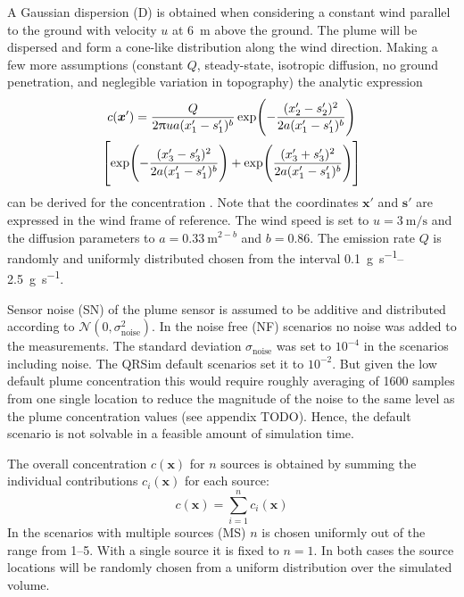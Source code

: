 \documentclass[11pt,a4paper]{scrreprt}
\newcommand{\vc}[1]{\bm{#1}}
\newcommand{\ped}[1]{_{\mathrm{#1}}}
\begin{document}
A Gaussian dispersion (D) is obtained when considering a constant wind parallel 
to the ground with velocity $u$ at \SI{6}{\meter} above the ground. The plume 
will be dispersed and form a cone-like distribution along the wind direction.  
Making a few more assumptions (constant $Q$, steady-state, isotropic diffusion, 
no ground penetration, and neglegible variation in topography) the analytic 
expression
\begin{multline}
    c(\vc x') = \frac{Q}{2\uppi ua(x'_1 - s'_1)^b} \exp\!\del{-\frac{(x'_2 
            - s'_2)^2}{2a(x'_1 - s'_1)^b}} \\ \sbr{\exp\!\del{-\frac{(x'_3 
                - s'_3)^2}{2a(x'_1 - s'_1)^b}} + \exp\!\del{\frac{(x'_3 
                + s'_3)^2}{2a(x'_1 - s'_1)^b}}}
\end{multline}
can be derived for the concentration \parencite{Stockie:2011fd}. Note that the 
coordinates $\vc x'$ and $\vc s'$ are expressed in the wind frame of reference. 
The wind speed is set to $u = \SI{3}{\meter\per\second}$ and the diffusion 
parameters to $a = \SI{0.33}{\meter\tothe{2 - \mathit{b}}}$ and $b = 0.86$.  The 
emission rate $Q$ is randomly and uniformly distributed chosen from the interval 
\SIrange{0.1}{2.5}{\gram\per\second}.

Sensor noise (SN) of the plume sensor is assumed to be additive and distributed 
according to $\mathcal{N}(0, \sigma\ped{noise}^2)$. In the noise free (NF) 
scenarios no noise was added to the measurements. The standard deviation 
$\sigma\ped{noise}$ was set to $10^{-4}$ in the scenarios including noise. The 
QRSim default scenarios set it to $10^{-2}$. But given the low default plume 
concentration this would require roughly averaging of 1600 samples from one 
single location to reduce the magnitude of the noise to the same level as the 
plume concentration values (see appendix TODO). Hence, the default scenario is 
not solvable in a feasible amount of simulation time.

The overall concentration $c(\vc x)$ for $n$ sources is obtained by summing the 
individual contributions $c_i(\vc x)$ for each source:
\begin{equation}
    c(\vc x) = \sum_{i = 1}^n c_i(\vc x)
\end{equation}
In the scenarios with multiple sources (MS) $n$ is chosen uniformly out of the 
range from \numrange{1}{5}. With a single source it is fixed to $n = 1$. In both 
cases the source locations will be randomly chosen from a uniform distribution 
over the simulated volume.
\end{document}
